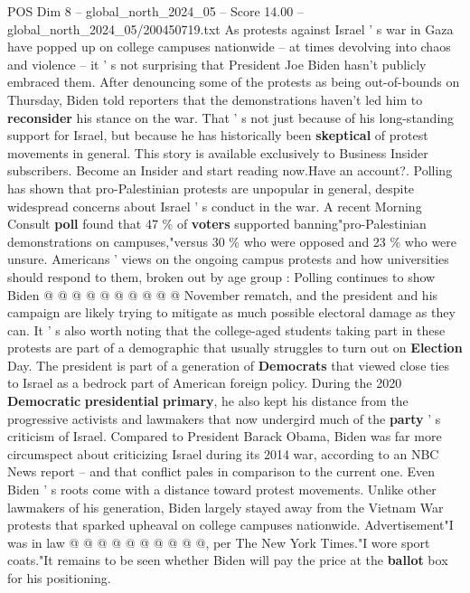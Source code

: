 \begin{textsample}{POS Dim 8 – global\_north\_2024\_05 – Score 14.00 – global\_north\_2024\_05/200450719.txt}  \label{ex:f8_pos_071}
As protests against Israel ' s war in Gaza have popped up on college campuses nationwide -- at times devolving into chaos and violence -- it ' s not surprising that President Joe Biden hasn't publicly embraced them.
After denouncing some of the protests as being out-of-bounds on Thursday, Biden told reporters that the demonstrations haven't led him to \textbf{reconsider} his stance on the war.
That ' s not just because of his long-standing support for Israel, but because he has historically been \textbf{skeptical} of protest movements in general.
This story is available exclusively to Business Insider subscribers.
Become an Insider and start reading now.Have an account?.
Polling has shown that pro-Palestinian protests are unpopular in general, despite widespread concerns about Israel ' s conduct in the war.
A recent Morning Consult \textbf{poll} found that 47 \% of \textbf{voters} supported banning"pro-Palestinian demonstrations on campuses,"versus 30 \% who were opposed and 23 \% who were unsure.
Americans ' views on the ongoing campus protests and how universities should respond to them, broken out by age group : Polling continues to show Biden @ @ @ @ @ @ @ @ @ @ November rematch, and the president and his campaign are likely trying to mitigate as much possible electoral damage as they can.
It ' s also worth noting that the college-aged students taking part in these protests are part of a demographic that usually struggles to turn out on \textbf{Election} Day.
The president is part of a generation of \textbf{Democrats} that viewed close ties to Israel as a bedrock part of American foreign policy.
During the 2020 \textbf{Democratic} \textbf{presidential} \textbf{primary}, he also kept his distance from the progressive activists and lawmakers that now undergird much of the \textbf{party} ' s criticism of Israel.
Compared to President Barack Obama, Biden was far more circumspect about criticizing Israel during its 2014 war, according to an NBC News report -- and that conflict pales in comparison to the current one.
Even Biden ' s roots come with a distance toward protest movements.
Unlike other lawmakers of his generation, Biden largely stayed away from the Vietnam War protests that sparked upheaval on college campuses nationwide.
Advertisement"I was in law @ @ @ @ @ @ @ @ @ @, per The New York Times."I wore sport coats."It remains to be seen whether Biden will pay the price at the \textbf{ballot} box for his positioning.

\end{textsample}
